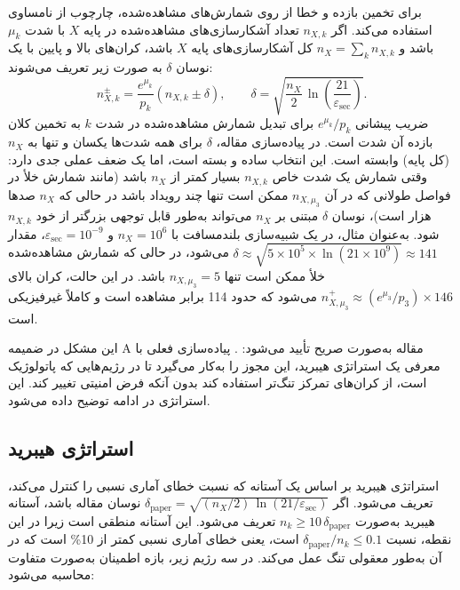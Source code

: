 برای تخمین بازده و خطا از روی شمارش‌های مشاهده‌شده، چارچوب  از نامساوی  استفاده می‌کند. اگر $n_{X,k}$ تعداد آشکارسازی‌های مشاهده‌شده در پایه $X$ با شدت $\mu_k$ باشد و $n_X = \sum_k n_{X,k}$ کل آشکارسازی‌های پایه $X$ باشد، کران‌های بالا و پایین با یک نوسان $\delta$ به صورت زیر تعریف می‌شوند:
\begin{equation}
	n_{X,k}^{\pm} = \frac{e^{\mu_k}}{p_k}\left(n_{X,k} \pm \delta\right), \qquad \delta = \sqrt{\frac{n_X}{2}\,\ln\!\left(\frac{21}{\varepsilon_{\text{sec}}}\right)}.
\end{equation}
ضریب پیشانی $e^{\mu_k}/p_k$ برای تبدیل شمارش مشاهده‌شده در شدت $k$ به تخمین کلان بازده آن شدت است. در پیاده‌سازی مقاله، $\delta$ برای همه شدت‌ها یکسان و تنها به $n_X$ (کل پایه) وابسته است. این انتخاب ساده و بسته است، اما یک ضعف عملی جدی دارد: وقتی شمارش یک شدت خاص $n_{X,k}$ بسیار کمتر از $n_X$ باشد (مانند شمارش خلأ در فواصل طولانی که در آن $n_{X,\mu_3}$ ممکن است تنها چند رویداد باشد در حالی که $n_X$ صدها هزار است)، نوسان $\delta$ مبتنی بر $n_X$ می‌تواند به‌طور قابل توجهی بزرگتر از خود $n_{X,k}$ شود. به‌عنوان مثال، در یک شبیه‌سازی بلندمسافت با $n_X = 10^6$ و $\varepsilon_{\text{sec}} = 10^{-9}$، مقدار $\delta \approx \sqrt{5\times10^5 \times \ln(21\times10^9)} \approx 141$ می‌شود، در حالی که شمارش مشاهده‌شده خلأ ممکن است تنها $n_{X,\mu_3} = 5$ باشد. در این حالت، کران بالای  $n_{X,\mu_3}^{+} \approx (e^{\mu_3}/p_3)\times 146$ می‌شود که حدود 114 برابر مشاهده است و کاملاً غیرفیزیکی است.

این مشکل در ضمیمه A مقاله به‌صورت صریح تأیید می‌شود: . پیاده‌سازی فعلی با معرفی یک استراتژی هیبرید، این مجوز را به‌کار می‌گیرد تا در رژیم‌هایی که  پاتولوژیک است، از کران‌های تمرکز تنگ‌تر استفاده کند بدون آنکه فرض امنیتی تغییر کند. این استراتژی در ادامه توضیح داده می‌شود.

\subsection{استراتژی هیبرید }

استراتژی هیبرید بر اساس یک آستانه که نسبت خطای آماری نسبی را کنترل می‌کند، تعریف می‌شود. اگر $\delta_{\text{paper}} = \sqrt{(n_X/2)\,\ln(21/\varepsilon_{\text{sec}})}$ نوسان  مقاله باشد، آستانه هیبرید به‌صورت $n_k \ge 10\,\delta_{\text{paper}}$ تعریف می‌شود. این آستانه منطقی است زیرا در این نقطه، نسبت $\delta_{\text{paper}}/n_k \le 0.1$ است، یعنی خطای آماری نسبی کمتر از 10\% است که در آن  به‌طور معقولی تنگ عمل می‌کند. در سه رژیم زیر، بازه اطمینان به‌صورت متفاوت محاسبه می‌شود:

